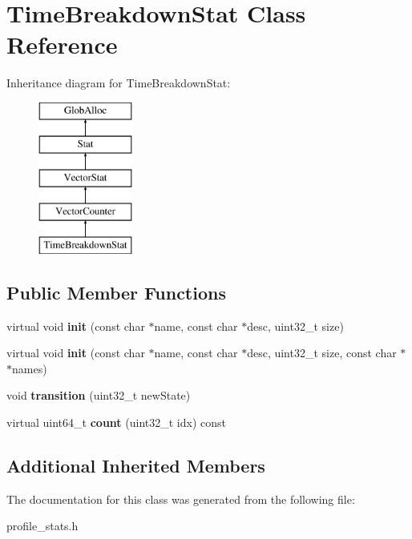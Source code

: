 \hypertarget{classTimeBreakdownStat}{\section{Time\-Breakdown\-Stat Class Reference}
\label{classTimeBreakdownStat}
}
Inheritance diagram for Time\-Breakdown\-Stat\-:\begin{figure}[H]
\begin{center}
\leavevmode
\includegraphics[height=5.000000cm]{classTimeBreakdownStat}
\end{center}
\end{figure}
\subsection*{Public Member Functions}
\begin{DoxyCompactItemize}
\item 
\hypertarget{classTimeBreakdownStat_a9aae6c3f1caecd26468fd753e2358487}{virtual void {\bfseries init} (const char $\ast$name, const char $\ast$desc, uint32\-\_\-t size)}\label{classTimeBreakdownStat_a9aae6c3f1caecd26468fd753e2358487}

\item 
\hypertarget{classTimeBreakdownStat_a562dfa6c2b1316bcafd0ffaf96e72b5f}{virtual void {\bfseries init} (const char $\ast$name, const char $\ast$desc, uint32\-\_\-t size, const char $\ast$$\ast$names)}\label{classTimeBreakdownStat_a562dfa6c2b1316bcafd0ffaf96e72b5f}

\item 
\hypertarget{classTimeBreakdownStat_af1486fd238a6dbe9d98d45b33e4c712a}{void {\bfseries transition} (uint32\-\_\-t new\-State)}\label{classTimeBreakdownStat_af1486fd238a6dbe9d98d45b33e4c712a}

\item 
\hypertarget{classTimeBreakdownStat_a48f5204f3168cc77e0fdd457e42195f2}{virtual uint64\-\_\-t {\bfseries count} (uint32\-\_\-t idx) const }\label{classTimeBreakdownStat_a48f5204f3168cc77e0fdd457e42195f2}

\end{DoxyCompactItemize}
\subsection*{Additional Inherited Members}


The documentation for this class was generated from the following file\-:\begin{DoxyCompactItemize}
\item 
profile\-\_\-stats.\-h\end{DoxyCompactItemize}
